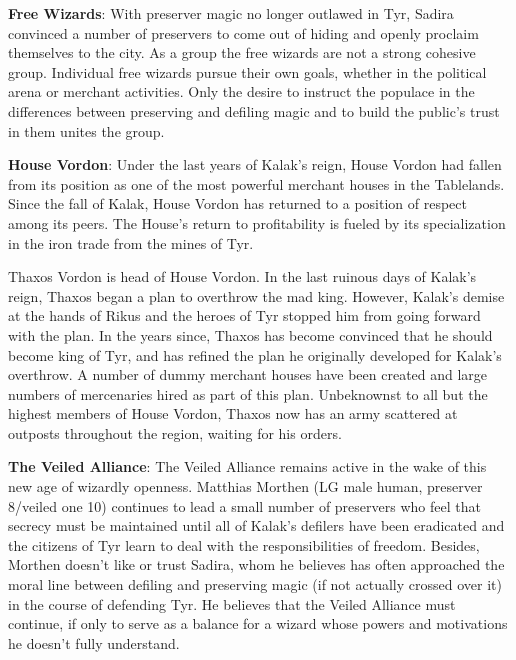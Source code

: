 {
	\textbf{Free Wizards}: With preserver magic no longer outlawed in Tyr, Sadira convinced a number of preservers to come out of hiding and openly proclaim themselves to the city. As a group the free wizards are not a strong cohesive group. Individual free wizards pursue their own goals, whether in the political arena or merchant activities. Only the desire to instruct the populace in the differences between preserving and defiling magic and to build the public's trust in them unites the group.

	\textbf{House Vordon}: Under the last years of Kalak's reign, House Vordon had fallen from its position as one of the most powerful merchant houses in the Tablelands. Since the fall of Kalak, House Vordon has returned to a position of respect among its peers. The House's return to profitability is fueled by its specialization in the iron trade from the mines of Tyr.

	Thaxos Vordon is head of House Vordon. In the last ruinous days of Kalak's reign, Thaxos began a plan to overthrow the mad king. However, Kalak's demise at the hands of Rikus and the heroes of Tyr stopped him from going forward with the plan. In the years since, Thaxos has become convinced that he should become king of Tyr, and has refined the plan he originally developed for Kalak's overthrow. A number of dummy merchant houses have been created and large numbers of mercenaries hired as part of this plan. Unbeknownst to all but the highest members of House Vordon, Thaxos now has an army scattered at outposts throughout the region, waiting for his orders.

	\textbf{The Veiled Alliance}: The Veiled Alliance remains active in the wake of this new age of wizardly openness. Matthias Morthen (LG male human, preserver 8/veiled one 10) continues to lead a small number of preservers who feel that secrecy must be maintained until all of Kalak's defilers have been eradicated and the citizens of Tyr learn to deal with the responsibilities of freedom. Besides, Morthen doesn't like or trust Sadira, whom he believes has often approached the moral line between defiling and preserving magic (if not actually crossed over it) in the course of defending Tyr. He believes that the Veiled Alliance must continue, if only to serve as a balance for a wizard whose powers and motivations he doesn't fully understand.
}
